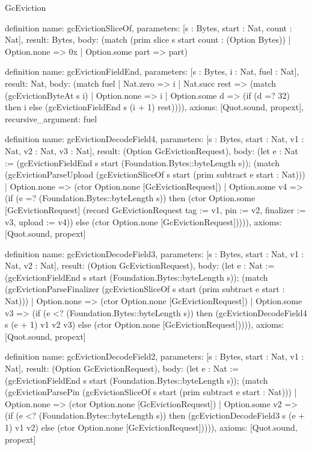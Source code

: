 \begin{lexlean}{GcEviction}
\begin{semanticmodule}
definition{
  name: gcEvictionSliceOf,
  parameters: [s : Bytes, start : Nat, count : Nat],
  result: Bytes,
  body: (match (prim slice s start count : (Option Bytes))
    | Option.none => 0x
    | Option.some part => part)
}

definition{
  name: gcEvictionFieldEnd,
  parameters: [s : Bytes, i : Nat, fuel : Nat],
  result: Nat,
  body: (match fuel
    | Nat.zero => i
    | Nat.succ rest => (match (gcEvictionByteAt s i)
      | Option.none => i
      | Option.some d => (if (d =? 32) then i else (gcEvictionFieldEnd s (i + 1) rest)))),
  axioms: [Quot.sound, propext],
  recursive_argument: fuel
}

definition{
  name: gcEvictionDecodeField4,
  parameters: [s : Bytes, start : Nat, v1 : Nat, v2 : Nat, v3 : Nat],
  result: (Option GcEvictionRequest),
  body: (let e : Nat := (gcEvictionFieldEnd s start (Foundation.Bytes::byteLength s)); (match (gcEvictionParseUpload (gcEvictionSliceOf s start (prim subtract e start : Nat)))
    | Option.none => (ctor Option.none [GcEvictionRequest])
    | Option.some v4 => (if (e =? (Foundation.Bytes::byteLength s)) then (ctor Option.some [GcEvictionRequest] (record GcEvictionRequest {tag := v1, pin := v2, finalizer := v3, upload := v4})) else (ctor Option.none [GcEvictionRequest])))),
  axioms: [Quot.sound, propext]
}

definition{
  name: gcEvictionDecodeField3,
  parameters: [s : Bytes, start : Nat, v1 : Nat, v2 : Nat],
  result: (Option GcEvictionRequest),
  body: (let e : Nat := (gcEvictionFieldEnd s start (Foundation.Bytes::byteLength s)); (match (gcEvictionParseFinalizer (gcEvictionSliceOf s start (prim subtract e start : Nat)))
    | Option.none => (ctor Option.none [GcEvictionRequest])
    | Option.some v3 => (if (e <? (Foundation.Bytes::byteLength s)) then (gcEvictionDecodeField4 s (e + 1) v1 v2 v3) else (ctor Option.none [GcEvictionRequest])))),
  axioms: [Quot.sound, propext]
}

definition{
  name: gcEvictionDecodeField2,
  parameters: [s : Bytes, start : Nat, v1 : Nat],
  result: (Option GcEvictionRequest),
  body: (let e : Nat := (gcEvictionFieldEnd s start (Foundation.Bytes::byteLength s)); (match (gcEvictionParsePin (gcEvictionSliceOf s start (prim subtract e start : Nat)))
    | Option.none => (ctor Option.none [GcEvictionRequest])
    | Option.some v2 => (if (e <? (Foundation.Bytes::byteLength s)) then (gcEvictionDecodeField3 s (e + 1) v1 v2) else (ctor Option.none [GcEvictionRequest])))),
  axioms: [Quot.sound, propext]
}


\end{semanticmodule}
\end{lexlean}
